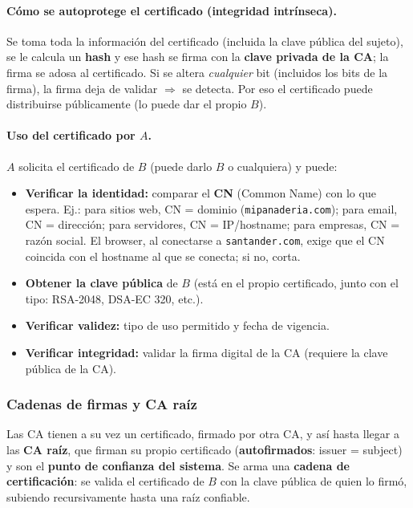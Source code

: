 \documentclass[../main.tex]{subfiles}
\begin{document}
\paragraph{Cómo se autoprotege el certificado (integridad intrínseca).} Se toma toda
la información del certificado (incluida la clave pública del sujeto), se le calcula
un \textbf{hash} y ese hash se firma con la \textbf{clave privada de la CA}; la firma
se adosa al certificado. Si se altera \emph{cualquier} bit (incluidos los bits de la
firma), la firma deja de validar $\Rightarrow$ se detecta. Por eso el certificado
puede distribuirse públicamente (lo puede dar el propio $B$).


\paragraph{Uso del certificado por $A$.} $A$ solicita el certificado de $B$ (puede
darlo $B$ o cualquiera) y puede:
\begin{itemize}[leftmargin=1.4em]
  \item \textbf{Verificar la identidad:} comparar el \textbf{CN} (Common Name) con lo
  que espera. Ej.: para sitios web, CN = dominio (\texttt{mipanaderia.com}); para
  email, CN = dirección; para servidores, CN = IP/hostname; para empresas, CN = razón
  social. El browser, al conectarse a \texttt{santander.com}, exige que el CN
  coincida con el hostname al que se conecta; si no, corta.
  \item \textbf{Obtener la clave pública} de $B$ (está en el propio certificado,
  junto con el tipo: RSA-2048, DSA-EC 320, etc.).
  \item \textbf{Verificar validez:} tipo de uso permitido y fecha de vigencia.
  \item \textbf{Verificar integridad:} validar la firma digital de la CA (requiere la
  clave pública de la CA).
\end{itemize}

\subsubsection{Cadenas de firmas y CA raíz}

Las CA tienen a su vez un certificado, firmado por otra CA, y así hasta llegar a las
\textbf{CA raíz}, que firman su propio certificado (\textbf{autofirmados}: issuer =
subject) y son el \textbf{punto de confianza del sistema}. Se arma una
\textbf{cadena de certificación}: se valida el certificado de $B$ con la clave
pública de quien lo firmó, subiendo recursivamente hasta una raíz confiable.
\end{document}
